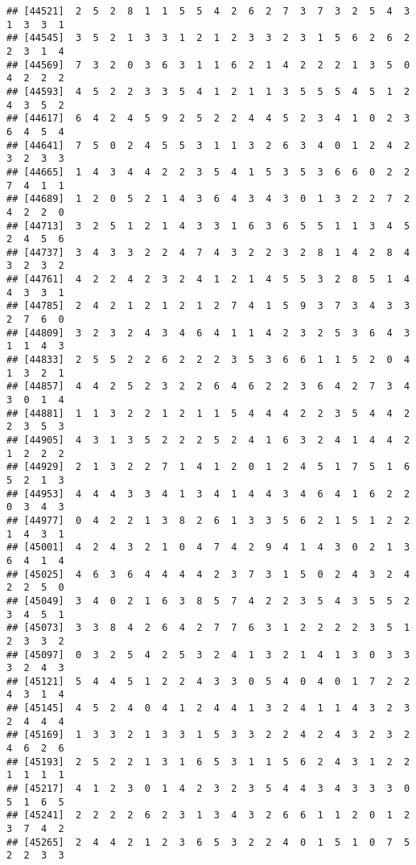 \documentclass[
]{article}
\begin{document}
\begin{verbatim}
## [44521]  2  5  2  8  1  1  5  5  4  2  6  2  7  3  7  3  2  5  4  3  1  3  3  1
## [44545]  3  5  2  1  3  3  1  2  1  2  3  3  2  3  1  5  6  2  6  2  2  3  1  4
## [44569]  7  3  2  0  3  6  3  1  1  6  2  1  4  2  2  2  1  3  5  0  4  2  2  2
## [44593]  4  5  2  2  3  3  5  4  1  2  1  1  3  5  5  5  4  5  1  2  4  3  5  2
## [44617]  6  4  2  4  5  9  2  5  2  2  4  4  5  2  3  4  1  0  2  3  6  4  5  4
## [44641]  7  5  0  2  4  5  5  3  1  1  3  2  6  3  4  0  1  2  4  2  3  2  3  3
## [44665]  1  4  3  4  4  2  2  3  5  4  1  5  3  5  3  6  6  0  2  2  7  4  1  1
## [44689]  1  2  0  5  2  1  4  3  6  4  3  4  3  0  1  3  2  2  7  2  4  2  2  0
## [44713]  3  2  5  1  2  1  4  3  3  1  6  3  6  5  5  1  1  3  4  5  2  4  5  6
## [44737]  3  4  3  3  2  2  4  7  4  3  2  2  3  2  8  1  4  2  8  4  3  2  3  2
## [44761]  4  2  2  4  2  3  2  4  1  2  1  4  5  5  3  2  8  5  1  4  4  3  3  1
## [44785]  2  4  2  1  2  1  2  1  2  7  4  1  5  9  3  7  3  4  3  3  2  7  6  0
## [44809]  3  2  3  2  4  3  4  6  4  1  1  4  2  3  2  5  3  6  4  3  1  1  4  3
## [44833]  2  5  5  2  2  6  2  2  2  3  5  3  6  6  1  1  5  2  0  4  1  3  2  1
## [44857]  4  4  2  5  2  3  2  2  6  4  6  2  2  3  6  4  2  7  3  4  3  0  1  4
## [44881]  1  1  3  2  2  1  2  1  1  5  4  4  4  2  2  3  5  4  4  2  2  3  5  3
## [44905]  4  3  1  3  5  2  2  2  5  2  4  1  6  3  2  4  1  4  4  2  1  2  2  2
## [44929]  2  1  3  2  2  7  1  4  1  2  0  1  2  4  5  1  7  5  1  6  5  2  1  3
## [44953]  4  4  4  3  3  4  1  3  4  1  4  4  3  4  6  4  1  6  2  2  0  3  4  3
## [44977]  0  4  2  2  1  3  8  2  6  1  3  3  5  6  2  1  5  1  2  2  1  4  3  1
## [45001]  4  2  4  3  2  1  0  4  7  4  2  9  4  1  4  3  0  2  1  3  6  4  1  4
## [45025]  4  6  3  6  4  4  4  4  2  3  7  3  1  5  0  2  4  3  2  4  2  2  5  0
## [45049]  3  4  0  2  1  6  3  8  5  7  4  2  2  3  5  4  3  5  5  2  3  4  5  1
## [45073]  3  3  8  4  2  6  4  2  7  7  6  3  1  2  2  2  2  3  5  1  2  3  3  2
## [45097]  0  3  2  5  4  2  5  3  2  4  1  3  2  1  4  1  3  0  3  3  3  2  4  3
## [45121]  5  4  4  5  1  2  2  4  3  3  0  5  4  0  4  0  1  7  2  2  4  3  1  4
## [45145]  4  5  2  4  0  4  1  2  4  4  1  3  2  4  1  1  4  3  2  3  2  4  4  4
## [45169]  1  3  3  2  1  3  3  1  5  3  3  2  2  4  2  4  3  2  3  2  4  6  2  6
## [45193]  2  5  2  2  1  3  1  6  5  3  1  1  5  6  2  4  3  1  2  2  1  1  1  1
## [45217]  4  1  2  3  0  1  4  2  3  2  3  5  4  4  3  4  3  3  3  0  5  1  6  5
## [45241]  2  2  2  2  6  2  3  1  3  4  3  2  6  6  1  1  2  0  1  2  3  7  4  2
## [45265]  2  4  4  2  1  2  3  6  5  3  2  2  4  0  1  5  1  0  7  5  2  2  3  3

\end{verbatim}
\end{document}
